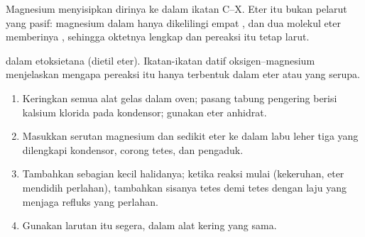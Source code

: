 Magnesium menyisipkan dirinya ke dalam ikatan C--X. Eter itu bukan
pelarut yang pasif: magnesium dalam  hanya dikelilingi empat
, dan dua molekul eter memberinya , sehingga oktetnya lengkap dan pereaksi itu tetap larut.

\begin{omfigure}

{\small {} dalam etoksietana (dietil eter). Ikatan-ikatan
datif oksigen--magnesium menjelaskan mengapa pereaksi itu hanya
terbentuk dalam eter atau  yang serupa.}
\end{omfigure}

\begin{method}\label{met:b1:organomagnesium:prepare}
\begin{enumerate}
  \item Keringkan semua alat gelas dalam oven; pasang tabung pengering
        berisi kalsium klorida pada kondensor; gunakan eter anhidrat.
  \item Masukkan serutan magnesium dan sedikit eter ke dalam labu leher
        tiga yang dilengkapi kondensor, corong tetes, dan pengaduk.
  \item Tambahkan sebagian kecil halidanya; ketika reaksi mulai
        (kekeruhan, eter mendidih perlahan), tambahkan sisanya tetes demi
        tetes dengan laju yang menjaga refluks yang perlahan.
  \item Gunakan larutan itu segera, dalam alat kering yang sama.
\end{enumerate}
\end{method}

